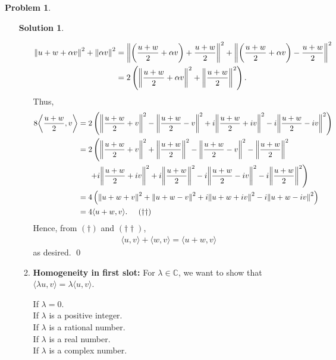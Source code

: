\documentclass{article}
\theoremstyle{definition}
\newtheorem*{prob*}{Problem}
\newtheorem*{sln*}{Solution}
\newcommand{\la}{\langle}
\newcommand{\ra}{\rangle}
\begin{document}
\begin{prob*}
\begin{enumerate}
\begin{sln*}
\begin{enumerate}
				\begin{align*}
				\norm{u + w + \alpha v}^2 + \norm{\alpha v}^2 &= \norm{\left(\frac{u+w}{2} + \alpha v \right)+ \frac{u+w}{2}}^2 + \norm{\left(\frac{u+w}{2} + \alpha v\right) - \frac{u+w}{2}}^2\\
				&= 2\left(  \norm{\frac{u+w}{2} + \alpha v}^2 + \norm{\frac{u+w}{2}}^2  \right).
				\end{align*} 
				Thus,
				\begin{align*}
				8 \bigg\langle \frac{u+w}{2}, v \bigg\rangle &= 2\left( \norm{ \frac{u + w}{2}+ v}^2 - \norm{\frac{u + w}{2} -v}^2 + i\norm{\frac{u+w}{2}+iv}^2 - i\norm{\frac{u+w}{2}-iv}^2 \right)\\
				&= 2\left( \norm{ \frac{u + w}{2}+ v}^2 + \norm{\frac{u+w}{2}}^2 - \norm{\frac{u + w}{2} -v}^2 - \norm{\frac{u+w}{2}}^2 \right.\\
				&\left.\hspace{0.5cm}+ i\norm{\frac{u+w}{2}+iv}^2 + i \norm{\frac{u+w}{2}}^2 - i\norm{\frac{u+w}{2}-iv}^2-i \norm{\frac{u+w}{2}}^2 \right)\\
				&= 4 \left( \norm{u+w + v}^2 + \norm{u+w-v}^2 + i \norm{u+w+iv}^2 - i\norm{u+w-iv}^2 \right)\\
				&= 4\la u+w, v \ra. 	\hspace{0.5cm} (\dagger\dagger)
				\end{align*}
				Hence, from $(\dagger)$ and $(\dagger\dagger)$,
				\begin{align*}
				\la u,v \ra + \la w,v \ra = \la u+w,v \ra
				\end{align*}
				as desired. \qed
				
				
				\item \textbf{Homogeneity in first slot:} For $\lambda \in \mathbb{C}$, we want to show that $\la \lambda u,v\ra = \lambda \la u , v \ra$. 
				
				If $\lambda = 0$.\\
				If $\lambda$ is a positive integer.\\
				If $\lambda$ is a rational number.\\
				If $\lambda$ is a real number.\\
				If $\lambda$ is a complex number.\\
				

\end{enumerate}
\end{sln*}
\end{enumerate}
\end{prob*}
\end{document}
